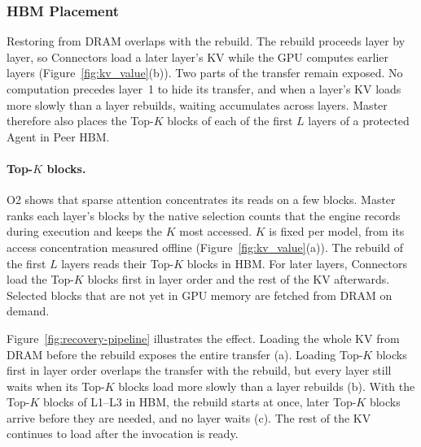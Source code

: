 \subsubsection{HBM Placement}
\label{sec:region-selection}

Restoring from DRAM overlaps with the rebuild. The rebuild proceeds layer
by layer, so Connectors load a later layer's KV while the GPU computes
earlier layers (Figure~\ref{fig:kv_value}(b)). Two parts of the transfer
remain exposed. No computation precedes layer~1 to hide its transfer, and
when a layer's KV loads more slowly than a layer rebuilds, waiting
accumulates across layers. Master therefore also places the Top-$K$
blocks of each of the first $L$ layers of a protected Agent in Peer HBM.

\paragraph{Top-$K$ blocks.}
O2 shows that sparse attention concentrates its reads on a few blocks.
Master ranks each layer's blocks by the native selection counts that the
engine records during execution and keeps the $K$ most accessed. $K$ is
fixed per model, from its access concentration measured offline
(Figure~\ref{fig:kv_value}(a)). The rebuild of the first $L$ layers reads
their Top-$K$ blocks in HBM. For later layers, Connectors load the Top-$K$
blocks first in layer order and the rest of the KV afterwards. Selected
blocks that are not yet in GPU memory are fetched from DRAM on demand.

Figure~\ref{fig:recovery-pipeline} illustrates the effect. Loading the
whole KV from DRAM before the rebuild exposes the entire transfer (a).
Loading Top-$K$ blocks first in layer order overlaps the transfer with the
rebuild, but every layer still waits when its Top-$K$ blocks load more
slowly than a layer rebuilds (b). With the Top-$K$ blocks of L1--L3 in
HBM, the rebuild starts at once, later Top-$K$ blocks arrive before they
are needed, and no layer waits (c). The rest of the KV continues to load
after the invocation is ready.

